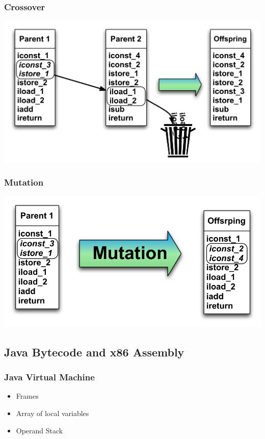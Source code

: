 \documentclass{beamer}
\begin{document}
\begin{frame}
	\frametitle{Crossover}

   \includegraphics[width=1\textwidth]{Illustrations/crossover.pdf}
       \\

\end{frame}

\begin{frame}
	\frametitle{Mutation}

   \includegraphics[width=1\textwidth]{Illustrations/mutation.pdf}
       \\

\end{frame}






\subsection[Bytecode and Assembly]{Java Bytecode and x86 Assembly}

\begin{frame}
	\frametitle{Java Virtual Machine}

\begin{itemize}	
\item Frames
\item Array of local variables
\item Operand Stack

\end{itemize}

\end{frame}
\end{document}
